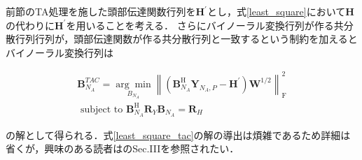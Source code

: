 \documentclass[a4paper]{jsarticle}
\begin{document}
前節のTA処理を施した頭部伝達関数行列を$\mathbf{H}^\prime$とし，式\ref{least_square}において$\mathbf{H}$の代わりに$\mathbf{H}^\prime$を用いることを考える．
さらにバイノーラル変換行列が作る共分散行列行列が，頭部伝達関数が作る共分散行列と一致するという制約を加えるとバイノーラル変換行列は

\begin{equation}
    \label{least_square_tac}
    \begin{array}{l}
        \boldsymbol{B}_{N_{A}}^{T A C}=\underset{B_{N_{A}}}{\arg \min }\left\|\left(\boldsymbol{B}_{N_{A}}^{\mathrm{H}} \boldsymbol{Y}_{N_{A}, P}-\boldsymbol{H^\prime}\right) \boldsymbol{W}^{1 / 2}\right\|_{\mathrm{F}}^{2} \\
        \text { subject to } \boldsymbol{B}_{N_{A}}^{\mathrm{H}} \boldsymbol{R}_{Y} \boldsymbol{B}_{N_{A}}=\boldsymbol{R}_{H}
    \end{array}
\end{equation}

の解として得られる．式\ref{least_square_tac}の解の導出は煩雑であるため詳細は省くが，興味のある読者は\cite{Zaunschirm2018-mn}のSec.IIIを参照されたい．





\end{document}

